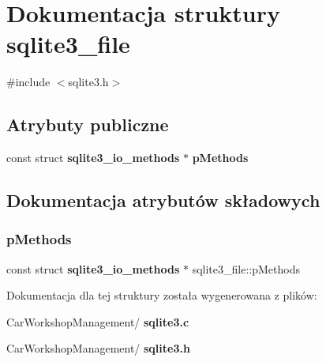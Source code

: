\section{Dokumentacja struktury sqlite3\+\_\+file}
\label{structsqlite3__file}


{\ttfamily \#include $<$sqlite3.\+h$>$}

\subsection*{Atrybuty publiczne}
\begin{DoxyCompactItemize}
\item 
const struct \textbf{ sqlite3\+\_\+io\+\_\+methods} $\ast$ \textbf{ p\+Methods}
\end{DoxyCompactItemize}


\subsection{Dokumentacja atrybutów składowych}
\mbox{\label{structsqlite3__file_afbe27b40382393e63784a4d4b43f3ad7}} 
\subsubsection{pMethods}
{\footnotesize\ttfamily const struct \textbf{ sqlite3\+\_\+io\+\_\+methods} $\ast$ sqlite3\+\_\+file\+::p\+Methods}



Dokumentacja dla tej struktury została wygenerowana z plików\+:\begin{DoxyCompactItemize}
\item 
Car\+Workshop\+Management/\textbf{ sqlite3.\+c}\item 
Car\+Workshop\+Management/\textbf{ sqlite3.\+h}\end{DoxyCompactItemize}
